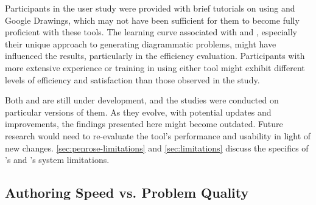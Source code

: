 Participants in the user study were provided with brief tutorials on using \Edgeworth and Google Drawings, which may not have been sufficient for them to become fully proficient with these tools. The learning curve associated with \Penrose and \Edgeworth, especially their unique approach to generating diagrammatic problems, might have influenced the results, particularly in the efficiency evaluation. Participants with more extensive experience or training in using either tool might exhibit different levels of efficiency and satisfaction than those observed in the study.



Both \Penrose and \Edgeworth are still under development, and the studies were conducted on particular versions of them. As they evolve, with potential updates and improvements, the findings presented here might become outdated. Future research would need to re-evaluate the tool's performance and usability in light of new changes. \cref{sec:penrose-limitations} and \cref{sec:limitations} discuss the specifics of \Penrose's and \Edgeworth's system limitations.

\subsection{Authoring Speed vs. Problem Quality}

